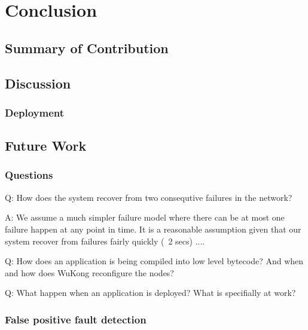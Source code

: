 \cleardoublepage
\singlespacing
\chapter{Conclusion}
\label{c:conclusion}
\doublespacing\nointerlineskip

\section{Summary of Contribution}

\section{Discussion}

\subsection{Deployment}


\section{Future Work}


\subsection{Questions}

Q: How does the system recover from two consequtive failures in the network?

A: We assume a much simpler failure model where there can be at most one
failure happen at any point in time. It is a reasonable assumption given that
our system recover from failures fairly quickly (~2 secs) ....


Q: How does an application is being compiled into low level bytecode? And when
and how does WuKong reconfigure the nodes?


Q: What happen when an application is deployed? What is specifially at work?

\subsection{False positive fault detection}

